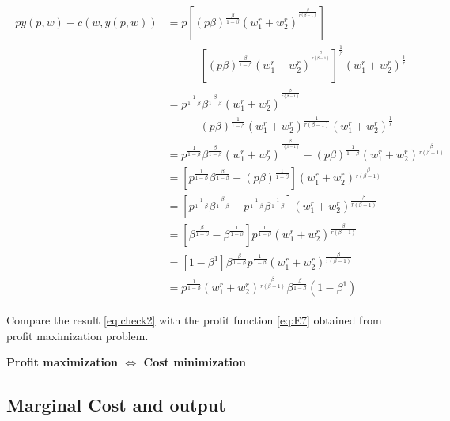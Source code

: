 \documentclass{article}
\begin{document}
\begin{align}
\begin{split}
py(p,w) - c(w, y(p,w)) &= p[(p \beta)^{\frac{\beta}{1- \beta}} (w_1^r + w_2^r)^{^{\frac{\beta}{r(\beta - 1)}}}] \\ 
&\ \ \ \ \ \ \ \ - [(p \beta)^{\frac{\beta}{1- \beta}} (w_1^r + w_2^r)^{^{\frac{\beta}{r(\beta - 1)}}}]^{\frac{1}{\beta}}{(w_1^r + w_2^r)^{\frac{1}{r}}} \\
&= p^{\frac{1}{1- \beta}} \beta^{\frac{\beta}{1- \beta}}(w_1^r + w_2^r)^{^{\frac{\beta}{r(\beta - 1)}}} \\ 
&\ \ \ \ \ \ \ \ - (p\beta)^{\frac{1}{1- \beta}} (w_1^r + w_2^r)^{\frac{1}{r(\beta - 1)}}(w_1^r + w_2^r)^{\frac{1}{r}} \\
&= p^{\frac{1}{1- \beta}} \beta^{\frac{\beta}{1- \beta}}(w_1^r + w_2^r)^{^{\frac{\beta}{r(\beta - 1)}}} - (p\beta)^{\frac{1}{1- \beta}} (w_1^r + w_2^r)^{\frac{\beta}{r(\beta - 1)}} \\
&= [p^{\frac{1}{1- \beta}} \beta^{\frac{\beta}{1- \beta}} - (p\beta)^{\frac{1}{1- \beta}}] (w_1^r + w_2^r)^{\frac{\beta}{r(\beta - 1)}} \\
&= [p^{\frac{1}{1- \beta}} \beta^{\frac{\beta}{1- \beta}} - p^{\frac{1}{1- \beta}} \beta^{\frac{1}{1- \beta}}] (w_1^r + w_2^r)^{\frac{\beta}{r(\beta - 1)}} \\
&= [ \beta^{\frac{\beta}{1- \beta}} -\beta^{\frac{1}{1- \beta}}] p^{\frac{1}{1- \beta}}(w_1^r + w_2^r)^{\frac{\beta}{r(\beta - 1)}} \\
&= [ 1 -\beta^1] \beta^{\frac{\beta}{1- \beta}} p^{\frac{1}{1- \beta}}(w_1^r + w_2^r)^{\frac{\beta}{r(\beta - 1)}} \\
&= p^{\frac{1}{1- \beta}}(w_1^r + w_2^r)^{\frac{\beta}{r(\beta - 1)}} \beta^{\frac{\beta}{1- \beta}}(1 -\beta^1)
\end{split}
\label{eq:check2}   
\end{align}

Compare the result \ref{eq:check2} with the profit function \ref{eq:E7} obtained from profit maximization problem.

\begin{center}
\textbf{Profit maximization $\iff$  Cost minimization}
\end{center}

\subsection{Marginal Cost and output}
\end{document}
